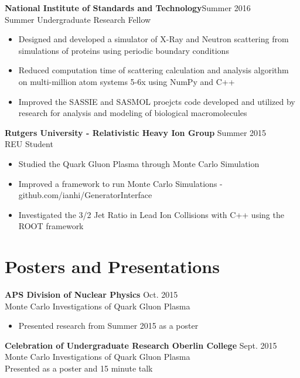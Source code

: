 \documentclass[margin]{res}
\begin{document}
\begin{resume}
	
	{\bf National Institute of Standards and Technology}\hfill Summer  2016\\ 
	Summer Undergraduate Research Fellow
	\begin{itemize} \itemsep -2pt  %
		\item Designed and developed a simulator of X-Ray and Neutron scattering from simulations of proteins using periodic boundary conditions
		\item Reduced computation time of scattering calculation and analysis algorithm on multi-million atom systems 5-6x using NumPy and C++
		\item Improved the SASSIE and SASMOL proejcts code developed and utilized by research for analysis and modeling of biological macromolecules
	\end{itemize}

	{\bf Rutgers University - Relativistic Heavy Ion Group} \hfill Summer  2015\\
	REU Student
	\begin{itemize} \itemsep -2pt  %
		\item Studied the Quark Gluon Plasma through Monte Carlo Simulation
		\item Improved a framework to run Monte Carlo Simulations - \tiny{github.com/ianhi/GeneratorInterface}\normalsize
		\item Investigated the 3/2 Jet Ratio in Lead Ion Collisions with C++ using the ROOT framework
	\end{itemize}
	 



\section{Posters and Presentations}

{\bf APS Division of Nuclear Physics} \hfill Oct.  2015\\
Monte Carlo Investigations of Quark Gluon Plasma 
\begin{itemize} \itemsep -2pt  %
	\item Presented research from Summer 2015 as a poster 
\end{itemize}

{\bf Celebration of Undergraduate Research Oberlin College} \hfill Sept. 2015 \\
Monte Carlo Investigations of Quark Gluon Plasma\\
Presented as a poster and 15 minute talk


\end{resume}
\end{document}
